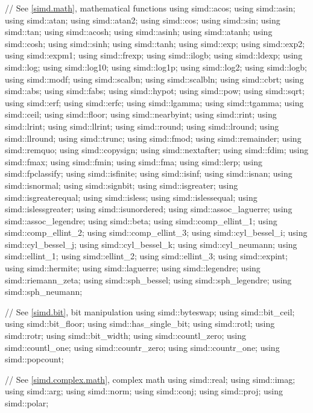 \begin{codeblock}
{  // See \ref{simd.math}, mathematical functions
  using simd::acos;
  using simd::asin;
  using simd::atan;
  using simd::atan2;
  using simd::cos;
  using simd::sin;
  using simd::tan;
  using simd::acosh;
  using simd::asinh;
  using simd::atanh;
  using simd::cosh;
  using simd::sinh;
  using simd::tanh;
  using simd::exp;
  using simd::exp2;
  using simd::expm1;
  using simd::frexp;
  using simd::ilogb;
  using simd::ldexp;
  using simd::log;
  using simd::log10;
  using simd::log1p;
  using simd::log2;
  using simd::logb;
  using simd::modf;
  using simd::scalbn;
  using simd::scalbln;
  using simd::cbrt;
  using simd::abs;
  using simd::fabs;
  using simd::hypot;
  using simd::pow;
  using simd::sqrt;
  using simd::erf;
  using simd::erfc;
  using simd::lgamma;
  using simd::tgamma;
  using simd::ceil;
  using simd::floor;
  using simd::nearbyint;
  using simd::rint;
  using simd::lrint;
  using simd::llrint;
  using simd::round;
  using simd::lround;
  using simd::llround;
  using simd::trunc;
  using simd::fmod;
  using simd::remainder;
  using simd::remquo;
  using simd::copysign;
  using simd::nextafter;
  using simd::fdim;
  using simd::fmax;
  using simd::fmin;
  using simd::fma;
  using simd::lerp;
  using simd::fpclassify;
  using simd::isfinite;
  using simd::isinf;
  using simd::isnan;
  using simd::isnormal;
  using simd::signbit;
  using simd::isgreater;
  using simd::isgreaterequal;
  using simd::isless;
  using simd::islessequal;
  using simd::islessgreater;
  using simd::isunordered;
  using simd::assoc_laguerre;
  using simd::assoc_legendre;
  using simd::beta;
  using simd::comp_ellint_1;
  using simd::comp_ellint_2;
  using simd::comp_ellint_3;
  using simd::cyl_bessel_i;
  using simd::cyl_bessel_j;
  using simd::cyl_bessel_k;
  using simd::cyl_neumann;
  using simd::ellint_1;
  using simd::ellint_2;
  using simd::ellint_3;
  using simd::expint;
  using simd::hermite;
  using simd::laguerre;
  using simd::legendre;
  using simd::riemann_zeta;
  using simd::sph_bessel;
  using simd::sph_legendre;
  using simd::sph_neumann;

  // See \ref{simd.bit}, bit manipulation
  using simd::byteswap;
  using simd::bit_ceil;
  using simd::bit_floor;
  using simd::has_single_bit;
  using simd::rotl;
  using simd::rotr;
  using simd::bit_width;
  using simd::countl_zero;
  using simd::countl_one;
  using simd::countr_zero;
  using simd::countr_one;
  using simd::popcount;

  // See \ref{simd.complex.math},  complex math
  using simd::real;
  using simd::imag;
  using simd::arg;
  using simd::norm;
  using simd::conj;
  using simd::proj;
  using simd::polar;
}
\end{codeblock}


